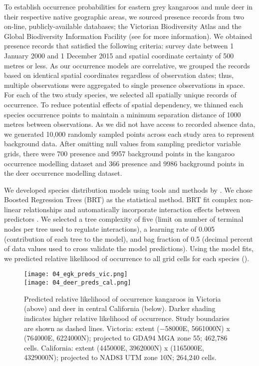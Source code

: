 To establish occurrence probabilities for eastern grey kangaroos and mule deer in their respective native geographic areas, we sourced presence records from two on-line, publicly-available databases; the Victorian Biodiversity Atlas and the Global Biodiversity Information Facility (see  for more information). We obtained presence records that satisfied the following criteria: survey date between 1 January 2000 and 1 December 2015 and spatial coordinate certainty of 500 metres or less. As our occurrence models are correlative, we grouped the records based on identical spatial coordinates regardless of observation dates; thus, multiple observations were aggregated to single presence observations in space. For each of the two study species, we selected all spatially unique records of occurrence.  To reduce potential effects of spatial dependency, we thinned each species occurrence points to maintain a minimum separation distance of 1000 metres between observations.  As we did not have access to recorded absence data, we generated 10,000 randomly sampled points across each study area to represent background data.  After omitting null values from sampling predictor variable grids, there were 700 presence and 9957 background points in the kangaroo occurrence modelling dataset and 366 presence and 9986 background points in the deer occurrence modelling dataset.

We developed species distribution models using tools and methods by \cite{elit09}. We chose Boosted Regression Trees (BRT) \citep{frie02} as the statistical method. BRT fit complex non-linear relationships and automatically incorporate interaction effects between predictors \citep{elit08}. We selected a tree complexity of five (limit on number of terminal nodes per tree used to regulate interactions), a learning rate of 0.005 (contribution of each tree to the model), and bag fraction of 0.5 (decimal percent of data values used to cross validate the model predictions). Using the model fits, we predicted relative likelihood of occurrence to all grid cells for each species ().

\begin{figure*}[!t]
  \centering
  \texttt{[image: 04\_egk\_preds\_vic.png]}\\
  \texttt{[image: 04\_deer\_preds\_cal.png]}
  \caption[Predicted relative likelihood of occurrence kangaroos in Victoria and deer in central California]{Predicted relative likelihood of occurrence kangaroos in Victoria (above) and deer in central California (below). Darker shading indicates higher relative likelihood of occurrence. Study boundaries are shown as dashed lines. Victoria: extent ($-$58000E, 5661000N) x (764000E, 6224000N); projected to GDA94 MGA zone 55; 462,786 cells. California: extent (445000E, 3962000N) x (1165000E, 4329000N); projected to NAD83 UTM zone 10N; 264,240 cells.}
  \label{cal_occ_preds}
\end{figure*}

